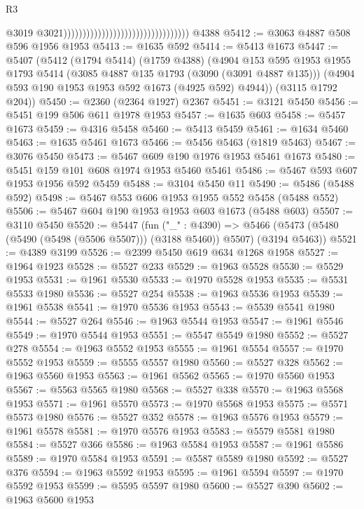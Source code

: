 \begin{lexlean}{R3}
\begin{coremodule}
                                                                      @3019
                                                                      @3021)))))))))))))))))))))))))))))))))
    @4388
@5412 := @3063 @4887 @508 @596 @1956 @1953
@5413 := @1635 @592
@5414 := @5413 @1673
@5447 := @5407
    (@5412
      (@1794 @5414)
      (@1759 @4388)
      (@4904
        @153
        @595
        @1953
        @1955
        @1793
        @5414
        (@3085 @4887 @135 @1793 (@3090 (@3091 @4887 @135)))
        (@4904 @593 @190 @1953 @1953 @592 @1673 (@4925 @592) @4944))
      (@3115 @1792 @204))
@5450 := @2360 (@2364 @1927) @2367
@5451 := @3121 @5450
@5456 := @5451 @199 @506 @611 @1978 @1953
@5457 := @1635 @603
@5458 := @5457 @1673
@5459 := @4316 @5458
@5460 := @5413 @5459
@5461 := @1634 @5460
@5463 := @1635 @5461 @1673
@5466 := @5456 @5463 (@1819 @5463)
@5467 := @3076 @5450
@5473 := @5467 @609 @190 @1976 @1953 @5461 @1673
@5480 := @5451 @159 @101 @608 @1974 @1953 @5460 @5461
@5486 := @5467 @593 @607 @1953 @1956 @592 @5459
@5488 := @3104 @5450 @11
@5490 := @5486 (@5488 @592)
@5498 := @5467 @553 @606 @1953 @1955 @552 @5458 (@5488 @552)
@5506 := @5467 @604 @190 @1953 @1953 @603 @1673 (@5488 @603)
@5507 := @3110 @5450
@5520 := @5447
    (fun ("_" : @4390) =>
    @5466 (@5473 (@5480 (@5490 (@5498 (@5506 @5507))) (@3188 @5460)) @5507) (@3194 @5463))
@5521 := @4389 @3199
@5526 := @2399 @5450 @619 @634 @1268 @1958
@5527 := @1964 @1923
@5528 := @5527 @233
@5529 := @1963 @5528
@5530 := @5529 @1953
@5531 := @1961 @5530
@5533 := @1970 @5528 @1953
@5535 := @5531 @5533 @1980
@5536 := @5527 @254
@5538 := @1963 @5536 @1953
@5539 := @1961 @5538
@5541 := @1970 @5536 @1953
@5543 := @5539 @5541 @1980
@5544 := @5527 @264
@5546 := @1963 @5544 @1953
@5547 := @1961 @5546
@5549 := @1970 @5544 @1953
@5551 := @5547 @5549 @1980
@5552 := @5527 @278
@5554 := @1963 @5552 @1953
@5555 := @1961 @5554
@5557 := @1970 @5552 @1953
@5559 := @5555 @5557 @1980
@5560 := @5527 @328
@5562 := @1963 @5560 @1953
@5563 := @1961 @5562
@5565 := @1970 @5560 @1953
@5567 := @5563 @5565 @1980
@5568 := @5527 @338
@5570 := @1963 @5568 @1953
@5571 := @1961 @5570
@5573 := @1970 @5568 @1953
@5575 := @5571 @5573 @1980
@5576 := @5527 @352
@5578 := @1963 @5576 @1953
@5579 := @1961 @5578
@5581 := @1970 @5576 @1953
@5583 := @5579 @5581 @1980
@5584 := @5527 @366
@5586 := @1963 @5584 @1953
@5587 := @1961 @5586
@5589 := @1970 @5584 @1953
@5591 := @5587 @5589 @1980
@5592 := @5527 @376
@5594 := @1963 @5592 @1953
@5595 := @1961 @5594
@5597 := @1970 @5592 @1953
@5599 := @5595 @5597 @1980
@5600 := @5527 @390
@5602 := @1963 @5600 @1953

\end{coremodule}
\end{lexlean}
